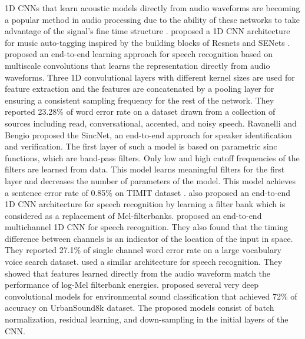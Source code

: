 \documentclass[preprint,final,12pt]{elsarticle}
\begin{document}
1D CNNs that learn acoustic models directly from audio waveforms are becoming a popular method in audio processing due to the ability of these networks to take advantage of the signal's fine time structure \citep{hoshen2015speech}. \citet{Kim2018} proposed a 1D CNN architecture for music auto-tagging inspired by the building blocks of Resnets \citep{resnet2016} and SENets \citep{SENets}. \citet{Zhu2016} proposed an end-to-end learning approach for speech recognition based on multiscale convolutions that learns the representation directly from audio waveforms. Three 1D convolutional layers with different kernel sizes are used for feature extraction and the features are concatenated by a pooling layer for ensuring a consistent sampling frequency for the rest of the network. They reported 23.28\% of word error rate on a dataset drawn from a collection of sources including read, conversational, accented, and noisy speech. Ravanelli and Bengio \citep{Ravanelli2018} proposed the SincNet, an end-to-end approach for speaker identification and verification. The first layer of such a model is based on parametric sinc functions, which are band-pass filters. Only low and high cutoff frequencies of the filters are learned from data. This model learns meaningful filters for the first layer and decreases the number of parameters of the model. This model achieves a sentence error rate of 0.85\% on TIMIT dataset \citep{garofolo1993darpa}. \citet{Zeghidour2018} also proposed an end-to-end 1D CNN architecture for speech recognition by learning a filter bank which is considered as a replacement of Mel-filterbanks. \citet{hoshen2015speech} proposed an end-to-end multichannel 1D CNN for speech recognition. They also found that the timing difference between channels is an indicator of the location of the input in space. They reported 27.1\% of single channel word error rate on a large vocabulary voice search dataset. \citet{sainath2015learning} used a similar architecture for speech recognition. They showed that features learned directly from the audio waveform match the performance of log-Mel filterbank energies. \citet{Dai2017} proposed several very deep convolutional models for environmental sound classification that achieved 72\% of accuracy on UrbanSound8k dataset. The proposed models consist of batch normalization, residual learning, and down-sampling in the initial layers of the CNN.
\end{document}
